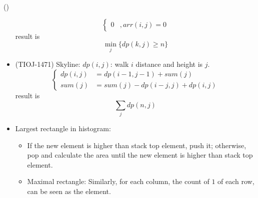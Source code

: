 \begin{theorem}{()}
\begin{itemize}
\begin{equation}
\begin{cases}
                0 &, arr(i, j) = 0
            \end{cases}
        \end{equation} result is \begin{equation}
            \min_{j} \{dp(k, j) \ge n\}
        \end{equation}
        \item (TIOJ-1471) Skyline: $dp(i, j)$: walk $i$ distance and height is $j$. \begin{equation}
            \begin{cases}
                dp(i, j) & = dp(i - 1, j - 1) + sum(j) \\
                sum(j) & = sum(j) -dp(i - j, j) + dp(i, j)
            \end{cases}
        \end{equation} result is \begin{equation}
            \sum_{j}dp(n, j)
        \end{equation}
        \item Largest rectangle in histogram: \begin{itemize}
            \item If the new element is higher than stack top element, push it; otherwise, pop and calculate the area until the new element is higher than stack top element.
            \item Maximal rectangle: Similarly, for each column, the count of $1$ of each row, can be seen as the element.
        \end{itemize}
    \end{itemize}
\end{theorem}
